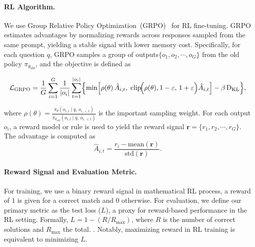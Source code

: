 \paragraph{RL Algorithm.}
We use Group Relative Policy Optimization~(GRPO)~\citep{shao2024deepseekmathpushinglimitsmathematical} for RL fine-tuning. GRPO estimates advantages by normalizing rewards across responses sampled from the same prompt, yielding a stable signal with lower memory cost. Specifically, for each question $q$, GRPO samples a group of outputs$\{o_1,o_2,\cdots,o_G\}$ from the old policy $\pi_{\theta_{old}}$, and the objective is defined as

\begin{equation}
\label{eq:GRPO}
\resizebox{\columnwidth}{!}{$
\begin{aligned}
\mathcal{L}_{\text{GRPO}}=
\frac{1}{G}\sum_{i=1}^{G}\frac{1}{\lvert o_i\rvert}\sum_{t=1}^{\lvert o_i\rvert}
\Bigl\{
  \min\Bigl[
  \rho(\theta)
      \,\hat A_{i,t},\; 
      \operatorname{clip}\!\Bigl(
          \rho(\theta),
         1-\varepsilon,\,
         1+\varepsilon
      \Bigr)\hat A_{i,t}
  \Bigr]
  -\beta\,\mathrm{D}_{\mathrm{KL}}
\Bigr\},
\end{aligned}
$}
\end{equation}

where $\rho(\theta)=\frac{\pi_{\theta}\!\left(o_{i,t}\mid q,\,o_{i,<t}\right)}{\pi_{\theta_{\mathrm{old}}}\!\left(o_{i,t}\mid q,\,o_{i,<t}\right)}$ is the important sampling weight. For each output $o_i$, a reward model or rule is used to yield the reward signal $\mathbf{r}=\{r_1,r_2,\cdots,r_G\}$. The advantage is computed as
\begin{equation}\label{eq:GRPO-Adv}
\hat{A}_{i,t} = \frac{r_i - \mathrm{mean}(\mathbf{r})}{\mathrm{std}(\mathbf{r})}.
\end{equation}


\paragraph{Reward Signal and Evaluation Metric.} For training, we use a binary reward signal in mathematical RL process, a reward of $1$ is given for a correct match and $0$ otherwise. For evaluation, we define our primary metric as the test loss ($L$), a proxy for reward-based performance in the RL setting. Formally, $L = 1 - (R / R_{\text{max}})$, where $R$ is the number of correct solutions and $R_{\text{max}}$ the total. . Notably, maximizing reward in RL training is equivalent to minimizing $L$.


